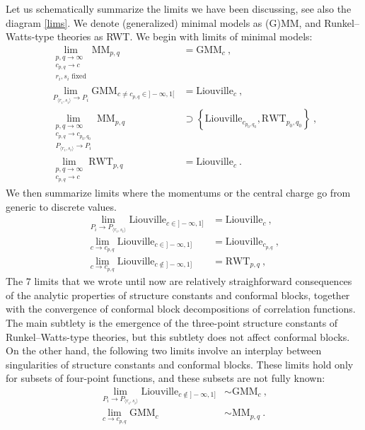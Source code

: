 \documentclass[12pt, a4paper, notitlepage, twoside]{report}
\numberwithin{equation}{section}
\theoremstyle{break}
\begin{document}
Let us schematically summarize the limits we have been discussing, see also the diagram \eqref{lims}. We denote (generalized) minimal models as (G)MM, and Runkel--Watts-type theories as RWT. We begin with limits of minimal models:
\begin{align}
 \lim_{\substack{p,q\to \infty \\ c_{p,q}\to c \\ r_i,s_i\text{ fixed}}} \text{MM}_{p,q} &= \text{GMM}_{c}\ ,
\\
 \lim_{P_{\langle r_i,s_i\rangle} \to P_i} \text{GMM}_{c\neq c_{p,q}\in]-\infty,1[} &= \text{Liouville}_{c} \ , 
 \\
 \lim_{\substack{p,q\to \infty \\ c_{p,q}\to c_{p_0,q_0} \\ P_{\langle r_i,s_i\rangle} \to P_i}} \text{MM}_{p,q}
 & \supset \left\{\text{Liouville}_{c_{p_0,q_0}}, \text{RWT}_{p_0,q_0}\right\}\ ,
 \\
 \lim_{\substack{p,q\to \infty \\ c_{p,q}\to c }} \text{RWT}_{p,q} & = \text{Liouville}_{c}\ .
\end{align}
 We then summarize limits where the momentums or the central charge go from generic to discrete values. 
\begin{align}
 \lim_{P_i\to P_{\langle r_i,s_i\rangle}} \text{Liouville}_{c\in ]-\infty,1]} &= \text{Liouville}_{c}\ ,
 \\
 \lim_{c\to c_{p,q}} \text{Liouville}_{c\in ]-\infty,1]} & = \text{Liouville}_{c_{p,q}}\ ,
 \\
 \lim_{c\to c_{p,q}} \text{Liouville}_{c\notin ]-\infty,1]} & = \text{RWT}_{p,q}\ ,
\end{align}
The $7$ limits that we wrote until now are relatively straighforward consequences of the analytic properties of structure constants and conformal blocks, together with the convergence of conformal block decompositions of correlation functions. The main subtlety is the emergence of the three-point structure constants of Runkel--Watts-type theories, but this subtlety does not affect conformal blocks. On the other hand, the following two limits involve an interplay between singularities of structure constants and conformal blocks. These limits hold only for subsets of four-point functions, and these subsets are not fully known:
\begin{align}
 \lim_{P_i\to P_{\langle r_i,s_i\rangle}} \text{Liouville}_{c\notin ]-\infty,1]} &\sim \text{GMM}_c\ ,
 \\
 \lim_{c\to c_{p,q}} \text{GMM}_c & \sim \text{MM}_{p, q}\ .
\end{align}
\end{document}
